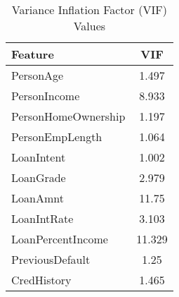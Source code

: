 \begin{table}[H]\centering
\caption{Variance Inflation Factor (VIF) Values}
\label{Table 4:vif_values}
\begin{tabular}{lc}
\toprule
Feature & VIF \\
\midrule
PersonAge & 1.497 \\
PersonIncome & 8.933 \\
PersonHomeOwnership & 1.197 \\
PersonEmpLength & 1.064 \\
LoanIntent & 1.002 \\
LoanGrade & 2.979 \\
LoanAmnt & 11.75 \\
LoanIntRate & 3.103 \\
LoanPercentIncome & 11.329 \\
PreviousDefault & 1.25 \\
CredHistory & 1.465 \\
\bottomrule
\end{tabular}
\end{table}
